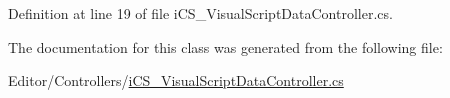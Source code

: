 Definition at line 19 of file i\+C\+S\+\_\+\+Visual\+Script\+Data\+Controller.\+cs.



The documentation for this class was generated from the following file\+:\begin{DoxyCompactItemize}
\item 
Editor/\+Controllers/\hyperlink{i_c_s___visual_script_data_controller_8cs}{i\+C\+S\+\_\+\+Visual\+Script\+Data\+Controller.\+cs}\end{DoxyCompactItemize}
